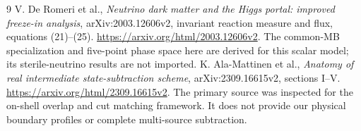 \documentclass[11pt]{article}
\begin{document}
\begin{thebibliography}{9}
 V. De Romeri et al.,
\emph{Neutrino dark matter and the Higgs portal: improved freeze-in analysis},
arXiv:2003.12606v2, invariant reaction measure and flux, equations (21)--(25).
\url{https://arxiv.org/html/2003.12606v2}.
The common-MB specialization and five-point phase space here are derived
for this scalar model; its sterile-neutrino results are not imported.
 K. Ala-Mattinen et al.,
\emph{Anatomy of real intermediate state-subtraction scheme},
arXiv:2309.16615v2, sections I--V.
\url{https://arxiv.org/html/2309.16615v2}.
The primary source was inspected for the on-shell overlap and cut matching
framework. It does not provide our physical boundary profiles or complete
multi-source subtraction.
\end{thebibliography}
\end{document}
